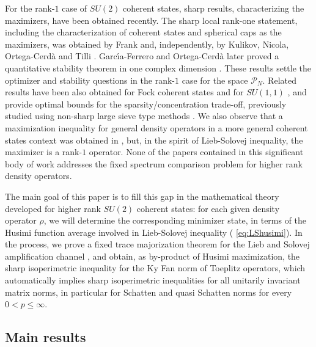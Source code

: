 \documentclass[12pt]{amsart}
\theoremstyle{plain}
\theoremstyle{definition}
\theoremstyle{remark}
\numberwithin{equation}{section}
\newcommand{\1}{\mathbf 1}
\begin{document}
For the rank-$1$ case of $SU(2)$ coherent states, sharp results,
characterizing the maximizers, have been obtained recently. The sharp local
rank-one statement, including the characterization of coherent states and
spherical caps as the maximizers, was obtained by Frank \cite{Frank} and,
independently, by Kulikov, Nicola, Ortega-Cerd\`{a} and Tilli \cite%
{Frank,KNOT}. Garc\'{\i}a-Ferrero and Ortega-Cerd\`{a} later proved a
quantitative stability theorem in one complex dimension \cite{GFOC}. These
results settle the optimizer and stability questions in the rank-$1$ case
for the space $\mathcal{P}_{N}$. Related results have been also obtained for
Fock coherent states \cite{Lieb1978,NicolaTilli2022,GGRT} and for $SU(1,1)$ 
\cite{Kulikov,RamTilli,ProcLMS}, and provide optimal bounds for the
sparsity/concentration trade-off, previously studied using non-sharp large
sieve type methods \cite{AbrSpeck,Speck}. We also observe that a
maximization inequality for general density operators in a more general
coherent states context was obtained in \cite[Section 2.3]{Frank}, but, in
the spirit of Lieb-Solovej inequality, the maximizer is a rank-$1$ operator.
None of the papers contained in this significant body of work addresses the
fixed spectrum comparison problem for higher rank density operators. 

The main goal of this paper is to fill this gap in the mathematical theory
developed for higher rank $SU(2)$ coherent states: for each given density
operator $\rho $, we will determine the corresponding minimizer state, in
terms of the Husimi function average involved in Lieb-Solovej inequality (%
\ref{eq:LShusimi}). In the process, we prove a fixed trace majorization
theorem for the Lieb and Solovej amplification channel \cite[Theorems~2.1]%
{LiebSolovej}, and obtain, as by-product of Husimi maximization, the sharp
isoperimetric inequality for the Ky Fan norm of Toeplitz operators, which
automatically implies sharp isoperimetric inequalities for all unitarily
invariant matrix norms, in particular for Schatten and quasi Schatten norms
for every $0<p\leq \infty $.

\subsection{Main results}
\end{document}
